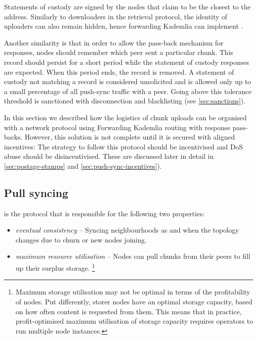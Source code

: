 Statements of custody are signed by the nodes that claim to be the closest to the address. 
Similarly to downloaders in the retrieval protocol, the identity of uploaders can also remain hidden, hence forwarding Kademlia can implement .

Another similarity is that in order to allow the pass-back mechanism for responses, nodes should remember which peer sent a particular chunk. This record should persist for a short period while the statement of custody responses are expected. When this period ends, the record is removed. A statement of custody not matching a record is considered unsolicited and is allowed only up to a small percentage of all push-sync traffic with a peer. Going above this tolerance threshold is sanctioned with disconnection and blacklisting (see \ref{sec:sanctions}).

In this section we described how the logistics of chunk uploads can be organised with a network protocol using Forwarding Kademlia routing with response pass-backs. However, this solution is not complete until it is secured with aligned incentives: The strategy to follow this protocol should be incentivised and DoS abuse should be disincentivised. These are discussed later in detail in \ref{sec:postage-stamps} and \ref{sec:push-sync-incentives}).

\subsection{Pull syncing\statusgreen}\label{sec:pull-syncing}

 is the protocol that is responsible for the following two properties: 

\begin{itemize}
    \item \emph{eventual consistency} -- Syncing neighbourhoods as and when the topology changes due to churn or new nodes joining.
    \item \emph{maximum resource utilisation} -- Nodes can pull chunks from their peers to fill up their surplus storage.%
%
\footnote{Maximum storage utilisation may not be optimal in terms of the profitability of nodes. Put differently, storer nodes have an optimal storage capacity, based on how often content is requested from them. This means that in practice, profit-optimised maximum utilisation of storage capacity requires operators to run multiple node instances.}
\end{itemize}

